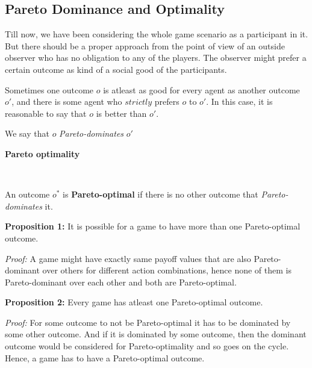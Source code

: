 \subsection{Pareto Dominance and Optimality}

Till now, we have been considering the whole game scenario as a participant in it. But there should be a proper approach from the point of view of an outside observer who has no obligation to any of the players. The observer might prefer a certain outcome as kind of a social good of the participants.\newline

Sometimes one outcome $o$ is atleast as good for every agent as another outcome $o'$, and there is some agent who $strictly$ prefers $o$ to $o'$. In this case, it is reasonable to say that $o$ is better than $o'$. 
\begin{center}We say that $o$ \textit{Pareto-dominates} $o'$\end{center}

\begin{large}\textbf{Pareto optimality}\end{large}\newline\

An outcome $o^*$ is \textbf{Pareto-optimal} if there is no other outcome that \textit{Pareto-dominates} it.
\begin{flushleft}
\textbf{Proposition 1:} It is possible for a game to have more than one Pareto-optimal outcome.\newline

\textit{Proof:} A game might have exactly same payoff values that are also Pareto-dominant over others for different action combinations, hence none of them is Pareto-dominant over each other and both are Pareto-optimal.\newline

\textbf{Proposition 2:} Every game has atleast one Pareto-optimal outcome.\newline

\textit{Proof:} For some outcome to not be Pareto-optimal it has to be dominated by some other outcome. And if it is dominated by some outcome, then the dominant outcome would be considered for Pareto-optimality and so goes on the cycle. Hence, a game has to have a Pareto-optimal outcome.
\end{flushleft}